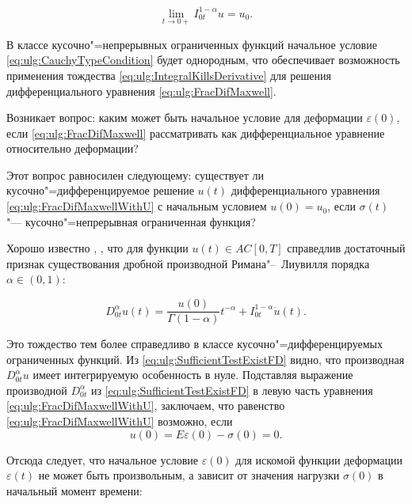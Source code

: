 \begin{equation}\label{eq:ulg:CauchyTypeCondition}

\lim_{t\to 0+}I^{1-\alpha}_{0t}u=u_{0}.

\end{equation}

В классе кусочно"=непрерывных ограниченных функций начальное условие \eqref{eq:ulg:CauchyTypeCondition} будет однородным, что обеспечивает возможность применения тождества \eqref{eq:ulg:IntegralKillsDerivative} для решения дифференциального уравнения \eqref{eq:ulg:FracDifMaxwell}. 

Возникает вопрос: каким может быть начальное условие для деформации $\varepsilon(0)$, если \eqref{eq:ulg:FracDifMaxwell} рассматривать как дифференциальное уравнение относительно деформации? 

Этот вопрос равносилен следующему: существует ли кусочно"=дифференцируемое решение $u(t)$ дифференциального уравнения \eqref{eq:ulg:FracDifMaxwellWithU} с начальным условием $u(0)=u_{0}$, если $\sigma(t)$ "---  кусочно"=непрерывная  ограниченная функция?





Хорошо известно \cite[с.~73]{ulg:bib:K-S-T}, \cite[с.~46]{ulg:bib:S-K-M}, что для функции $u(t)\in AC[0,T]$ справедлив достаточный признак существования дробной производной Римана"--~Лиувилля порядка $\alpha\in(0, 1)$:

 \begin{equation}\label{eq:ulg:SufficientTestExistFD}

D^{\alpha}_{0t}u(t)=\frac{u(0)}{\Gamma(1-\alpha)}t^{-\alpha}+I^{1-\alpha}_{0t}\dot{u}(t).

\end{equation}



Это тождество тем более справедливо в классе кусочно"=дифференцируемых  ограниченных функций. Из \eqref{eq:ulg:SufficientTestExistFD} видно, что производная $D^{\alpha}_{0t}u$ имеет интегрируемую особенность в нуле. Подставляя выражение производной $D^{\alpha}_{0t}$ из \eqref{eq:ulg:SufficientTestExistFD} в левую часть уравнения \eqref{eq:ulg:FracDifMaxwellWithU}, заключаем, что равенство \eqref{eq:ulg:FracDifMaxwellWithU} возможно, если $$u(0)=E\varepsilon(0)-\sigma(0)=0.$$ 

Отсюда следует, что начальное условие $\varepsilon(0)$ для искомой функции деформации $\varepsilon(t)$ не может быть произвольным, а зависит от значения нагрузки  $\sigma(0)$ в начальный момент времени:

